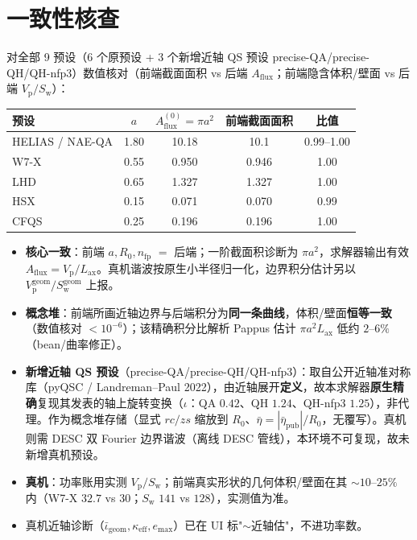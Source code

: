 \documentclass[UTF8,11pt]{ctexart}
\newcommand{\Vp}{V_\mathrm{p}}
\newcommand{\Sw}{S_\mathrm{w}}
\newcommand{\Aflux}{A_\mathrm{flux}}
\newcommand{\Lax}{L_\mathrm{ax}}
\newcommand{\iotabar}{\bar{\iota}}
\begin{document}
\section{一致性核查}\label{sec:consistency}

对全部 9 预设（6 个原预设 + 3 个新增近轴 QS 预设 precise-QA/precise-QH/QH-nfp3）数值核对（前端截面面积 vs 后端 $\Aflux$；前端隐含体积/壁面 vs 后端 $\Vp/\Sw$）：

\begin{center}
\renewcommand{\arraystretch}{1.25}
\begin{tabular}{@{}lcccc@{}}
\toprule
预设 & $a$ & $\Aflux^{(0)}=\pi a^2$ & 前端截面面积 & 比值 \\
\midrule
HELIAS / NAE-QA & 1.80 & 10.18 & 10.1 & 0.99–1.00 \\
W7-X & 0.55 & 0.950 & 0.946 & 1.00 \\
LHD  & 0.65 & 1.327 & 1.327 & 1.00 \\
HSX  & 0.15 & 0.071 & 0.070 & 0.99 \\
CFQS & 0.25 & 0.196 & 0.196 & 1.00 \\
\bottomrule
\end{tabular}
\end{center}

\begin{itemize}
\item \textbf{核心一致}：前端 $a,R_0,n_\mathrm{fp}$ $=$ 后端；一阶截面积诊断为 $\pi a^2$，求解器输出有效 $\Aflux=\Vp/\Lax$。真机谐波按原生小半径归一化，边界积分估计另以 $\Vp^{\mathrm{geom}}/\Sw^{\mathrm{geom}}$ 上报。
\item \textbf{概念堆}：前端所画近轴边界与后端积分为\textbf{同一条曲线}，体积/壁面\textbf{恒等一致}（数值核对 $<10^{-6}$）；该精确积分比解析 Pappus 估计 $\pi a^2\Lax$ 低约 $2$–$6\%$（bean/曲率修正）。
\item \textbf{新增近轴 QS 预设}（precise-QA/precise-QH/QH-nfp3）：取自公开近轴准对称库（pyQSC / Landreman--Paul 2022），由近轴展开\textbf{定义}，故本求解器\textbf{原生精确}复现其发表的轴上旋转变换（$\iota$：QA $0.42$、QH $1.24$、QH-nfp3 $1.25$），非代理。作为概念堆存储（显式 $rc/zs$ 缩放到 $R_0$、$\bar\eta=|\bar\eta_\mathrm{pub}|/R_0$，无覆写）。真机则需 DESC 双 Fourier 边界谐波（离线 DESC 管线），本环境不可复现，故未新增真机预设。
\item \textbf{真机}：功率账用实测 $\Vp/\Sw$；前端真实形状的几何体积/壁面在其 $\sim10$–$25\%$ 内（W7-X $32.7$ vs $30$；$\Sw$ $141$ vs $128$），实测值为准。
\item 真机近轴诊断（$\iotabar_\mathrm{geom},\kappa_\mathrm{eff},e_\mathrm{max}$）已在 UI 标"$\sim$近轴估"，不进功率数。
\end{itemize}
\end{document}
